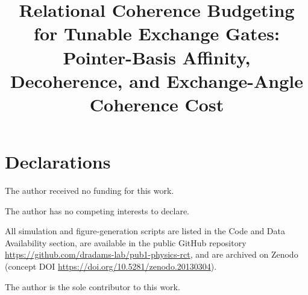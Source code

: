 \documentclass[pdflatex,sn-basic]{sn-jnl}
\begin{document}

\title[Relational Coherence Budgeting for Tunable Exchange Gates]{Relational
       Coherence Budgeting for Tunable Exchange Gates: Pointer-Basis
       Affinity, Decoherence, and Exchange-Angle Coherence Cost}

\author*[1]{ }


\abstract{}


\maketitle












\section*{Declarations}

 The author received no funding for this work.

 The author has no competing interests to declare.

 All simulation and figure-generation
scripts are listed in the Code and Data Availability section, are available in
the public GitHub repository \url{https://github.com/dradams-lab/pub1-physics-rct},
and are archived on Zenodo (concept DOI \url{https://doi.org/10.5281/zenodo.20130304}).

 The author is the sole contributor to this work.

\begin{appendices}

\end{appendices}


\end{document}
